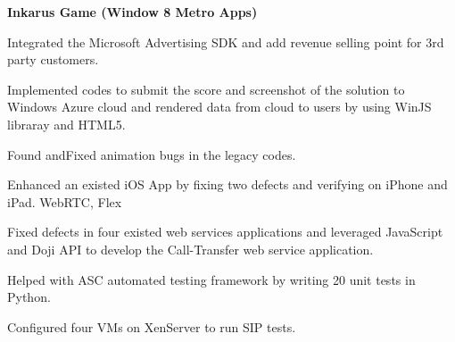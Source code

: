 \documentclass[a4paper]{lyu-resume} %
\begin{document}
\begin{minipage}[t]{0.66\textwidth}
\vspace{2 mm}
\textbf{Inkarus Game (Window 8 Metro Apps)}
\begin{tightitemize}
\item Integrated the Microsoft Advertising SDK and add revenue selling point for 3rd party customers. 
\item Implemented codes to submit the score and screenshot of the solution to Windows Azure cloud and rendered data from cloud to users by using WinJS libraray and HTML5.
\item Found andFixed animation bugs in the legacy codes.
\end{tightitemize}

\sectionspace %



\begin{tightitemize}
\item Enhanced an existed iOS App by fixing two defects and verifying on iPhone and iPad. WebRTC, Flex
\item Fixed defects in four existed web services applications and leveraged JavaScript and Doji API to develop the Call-Transfer web service application. 
\item Helped with ASC automated testing framework by writing 20 unit tests in Python.
\item Configured four VMs on XenServer to run SIP tests.
\end{tightitemize}


\begin{tightitemize}
\item 
\end{tightitemize}

\begin{tightitemize}
\item 
\end{tightitemize}

\begin{tightitemize}
\item 
\end{tightitemize}


\end{minipage}
\end{document}
